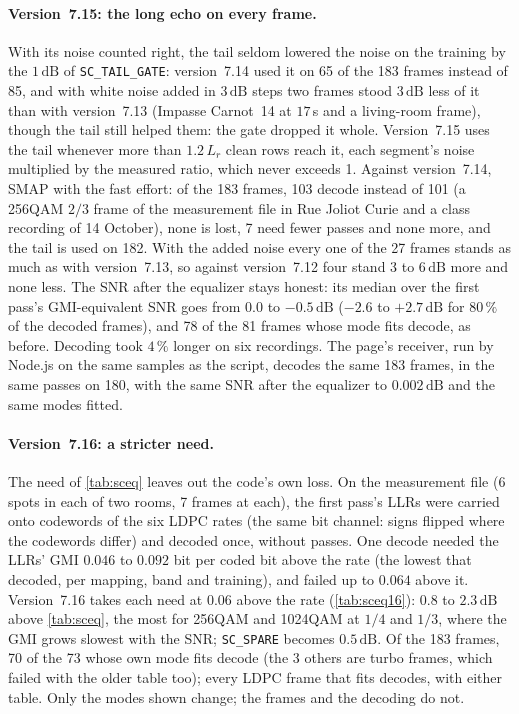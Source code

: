 \documentclass[11pt,a4paper]{article}
\newcommand{\dB}{\,\mathrm{dB}}
\newcommand{\code}[1]{\texttt{#1}}
\theoremstyle{remark}
\begin{document}
\paragraph{Version~7.15: the long echo on every frame.} With its noise counted right, the tail seldom lowered the noise on the training by the $1\dB$ of \code{SC\_TAIL\_GATE}: version~7.14 used it on 65 of the 183 frames instead of 85, and with white noise added in $3\dB$ steps two frames stood $3\dB$ less of it than with version~7.13 (Impasse Carnot~14 at $17$\,s and a living-room frame), though the tail still helped them: the gate dropped it whole. Version~7.15 uses the tail whenever more than $1.2\,L_r$ clean rows reach it, each segment's noise multiplied by the measured ratio, which never exceeds 1. Against version~7.14, SMAP with the fast effort: of the 183 frames, 103 decode instead of 101 (a 256QAM $2/3$ frame of the measurement file in Rue Joliot Curie and a class recording of 14 October), none is lost, 7 need fewer passes and none more, and the tail is used on 182. With the added noise every one of the 27 frames stands as much as with version~7.13, so against version~7.12 four stand 3 to $6\dB$ more and none less. The SNR after the equalizer stays honest: its median over the first pass's GMI-equivalent SNR goes from $0.0$ to $-0.5\dB$ ($-2.6$ to $+2.7\dB$ for $80\,\%$ of the decoded frames), and 78 of the 81 frames whose mode fits decode, as before. Decoding took $4\,\%$ longer on six recordings. The page's receiver, run by Node.js on the same samples as the script, decodes the same 183 frames, in the same passes on 180, with the same SNR after the equalizer to $0.002\dB$ and the same modes fitted.

\paragraph{Version~7.16: a stricter need.} The need of \cref{tab:sceq} leaves out the code's own loss. On the measurement file (6 spots in each of two rooms, 7 frames at each), the first pass's LLRs were carried onto codewords of the six LDPC rates (the same bit channel: signs flipped where the codewords differ) and decoded once, without passes. One decode needed the LLRs' GMI $0.046$ to $0.092$ bit per coded bit above the rate (the lowest that decoded, per mapping, band and training), and failed up to $0.064$ above it. Version~7.16 takes each need at $0.06$ above the rate (\cref{tab:sceq16}): $0.8$ to $2.3\dB$ above \cref{tab:sceq}, the most for 256QAM and 1024QAM at $1/4$ and $1/3$, where the GMI grows slowest with the SNR; \code{SC\_SPARE} becomes $0.5\dB$. Of the 183 frames, 70 of the 73 whose own mode fits decode (the 3 others are turbo frames, which failed with the older table too); every LDPC frame that fits decodes, with either table. Only the modes shown change; the frames and the decoding do not.
\end{document}
